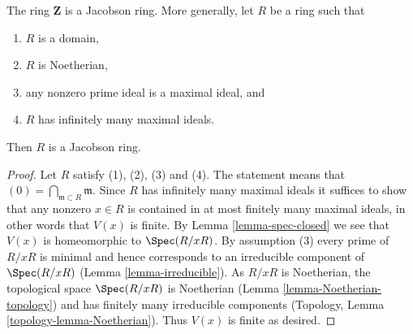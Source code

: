\begin{lemma}
\label{lemma-pid-jacobson}
The ring $\mathbf{Z}$ is a Jacobson ring.
More generally, let $R$ be a ring such that
\begin{enumerate}
\item $R$ is a domain,
\item $R$ is Noetherian,
\item any nonzero prime ideal is a maximal ideal, and
\item $R$ has infinitely many maximal ideals.
\end{enumerate}
Then $R$ is a Jacobson ring.
\end{lemma}

\begin{proof}
Let $R$ satisfy (1), (2), (3) and (4). The statement
means that $(0) = \bigcap_{\mathfrak m \subset R} \mathfrak m$.
Since $R$ has infinitely many maximal ideals it suffices to
show that any nonzero $x \in R$ is contained in at most
finitely many maximal ideals, in other words that $V(x)$ is finite.
By Lemma \ref{lemma-spec-closed}
we see that $V(x)$ is homeomorphic to $\Spec(R/xR)$.
By assumption (3) every prime of $R/xR$ is minimal and hence
corresponds to an irreducible component of $\Spec(R/xR)$
(Lemma \ref{lemma-irreducible}).
As $R/xR$ is Noetherian, the topological space $\Spec(R/xR)$
is Noetherian (Lemma \ref{lemma-Noetherian-topology})
and has finitely many irreducible components
(Topology, Lemma \ref{topology-lemma-Noetherian}).
Thus $V(x)$ is finite as desired.
\end{proof}